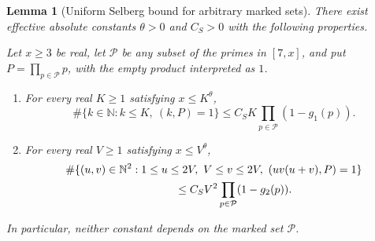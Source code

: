 \documentclass[11pt]{article}
\newtheorem{lemma}[theorem]{Lemma}
\theoremstyle{definition}
\theoremstyle{remark}
\numberwithin{equation}{section}
\newcommand{\N}{\mathbb N}
\begin{document}
\begin{lemma}[Uniform Selberg bound for arbitrary marked sets]
\label{lem:selberg-marked}
There exist effective absolute constants \(\theta>0\) and
\(C_S>0\) with the following properties.

Let \(x\ge3\) be real, let \(\mathcal P\) be any subset of the primes
in \([7,x]\), and put \(P=\prod_{p\in\mathcal P}p\), with the empty
product interpreted as \(1\).
\begin{enumerate}
\item For every real \(K\ge1\) satisfying \(x\le K^\theta\),
\begin{equation}\label{eq:marked-one}
 \#\{k\in\N:k\le K,\ (k,P)=1\}
 \le C_S K\prod_{p\in\mathcal P}(1-g_1(p)).
\end{equation}
\item For every real \(V\ge1\) satisfying \(x\le V^\theta\),
\begin{align}
 &\#\{(u,v)\in\N^2:1\le u\le2V,\ V\le v\le2V,\
                   (uv(u+v),P)=1\} \notag\\
 &\hspace{35mm}\le
 C_S V^2\prod_{p\in\mathcal P}(1-g_2(p)).
 \label{eq:marked-two}
\end{align}
\end{enumerate}
In particular, neither constant depends on the marked set
\(\mathcal P\).
\end{lemma}
\end{document}
